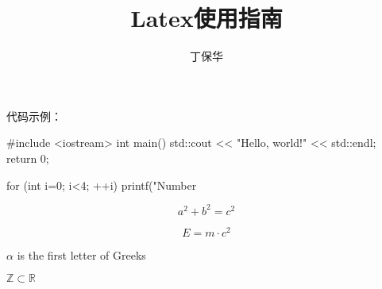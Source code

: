 \documentclass[14pt, oneside]{ctexart}
\title{Latex使用指南}
\author{丁保华}
\begin{document}
\maketitle

代码示例：
\linespread{2}
\begin{verbatim*}
#include <iostream>
int main()
{
    std::cout << "Hello, world!"
    << std::endl;
    return 0;
}
\end{verbatim*}

\linespread{1}
\begin{verbatim*}
    for (int i=0; i<4; ++i)
        printf("Number %d\n",i);
\end{verbatim*}



\[ a^2 + b^2 = c^2 \]


\[
E=m \cdot c^2
\]

$\alpha$ is the first letter of Greeks

$\mathbb{Z} \subset \mathbb{R}$
\end{document}
